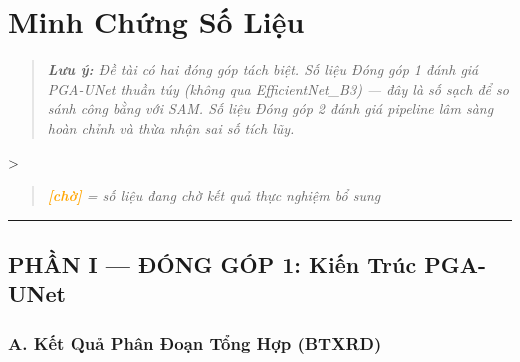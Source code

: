 
\section{Minh Chứng Số Liệu}

\begin{quote}\itshape \textbf{Lưu ý:} Đề tài có hai đóng góp tách biệt. Số liệu Đóng góp 1 đánh giá PGA-UNet thuần túy (không qua EfficientNet\_B3) — đây là số sạch để so sánh công bằng với SAM. Số liệu Đóng góp 2 đánh giá pipeline lâm sàng hoàn chỉnh và thừa nhận sai số tích lũy.\end{quote}
>
\begin{quote}\itshape \textcolor{orange}{\textbf{[chờ]}} = số liệu đang chờ kết quả thực nghiệm bổ sung\end{quote}

\vspace{0.5em}\hrule\vspace{0.5em}


\subsection{PHẦN I — ĐÓNG GÓP 1: Kiến Trúc PGA-UNet}


\subsubsection{A. Kết Quả Phân Đoạn Tổng Hợp (BTXRD)}

